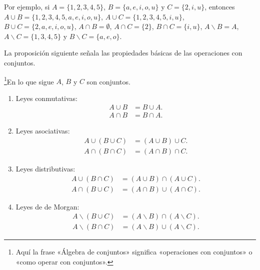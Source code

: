 \documentclass[12pt,a4paper]{book}
\begin{document}
    Por ejemplo, si $A=\{1,2,3,4,5\}$, $B=\{a,e,i,o,u\}$ y $C=\{2,i,u\}$,
    entonces $A\cup B=\{1,2,3,4,5,a,e,i,o,u\}$, $A\cup C=\{1,2,3,4,5,i,u\}$,
    $B\cup C=\{2,a,e,i,o,u\}$, $A\cap B=\emptyset$, $A\cap C=\{2\}$, $B\cap C=\{i,u\}$, $A\backslash B=A$,
    $A\backslash C=\{1,3,4,5\}$ y $B\backslash C=\{a,e,o\}$.

    La proposición siguiente señala las propiedades básicas de las operaciones
    con conjuntos.

    \begin{proposicion}\label{prop:2}
        \footnote{Aquí la frase «Álgebra de conjuntos» significa «operaciones con conjuntos» o «como
        operar con conjuntos».}En lo que sigue $A$, $B$ y $C$ son conjuntos.
        \begin{enumerate}
            \item Leyes conmutativas:
            \begin{align*}
                A\cup B&=B\cup A.\\
                A\cap B&=B\cap A.
            \end{align*}
            \item Leyes asociativas:
            \begin{align*}
                A\cup(B\cup C)&=(A\cup B)\cup C.\\
                A\cap(B\cap C)&=(A\cap B)\cap C.
            \end{align*}
            \item Leyes distributivas:
            \begin{align*}
                A\cup(B\cap C)&=(A\cup B)\cap(A\cup C).\\
                A\cap(B\cup C)&=(A\cap B)\cup(A\cap C).
            \end{align*}
            \item Leyes de de Morgan:
            \begin{align*}
                A\backslash(B\cup C)&=(A\backslash B)\cap(A\backslash C).\\
                A\backslash(B\cap C)&=(A\backslash B)\cup(A\backslash C).
            \end{align*}
        \end{enumerate}
    \end{proposicion}
\end{document}

